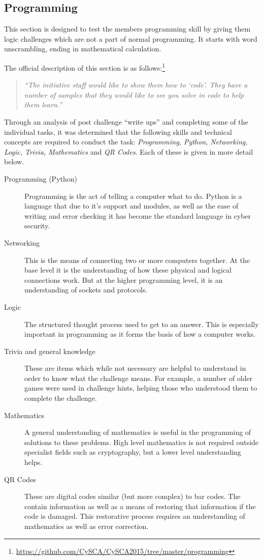 \documentclass[twoside,a4paper,11pt]{report}
\begin{document}
		\subsection{Programming}
			This section is designed to test the members programming skill by giving them logic challenges which are not a part of normal programming. 
			It starts with word unscrambling, ending in mathematical calculation. 
			
			The official description of this section is as follows:\footnote{\url{https://github.com/CySCA/CySCA2015/tree/master/programming}}
			\begin{quote}
				\textit{``The initiative staff would like to show them how to `code'. They have a number of samples that they would like to see you solve in code to help them learn.''}
			\end{quote}

			Through an analysis of post challenge ``write ups'' and completing some of the individual tasks, 
			it was determined that the following skills and technical concepts are required to conduct the task: 
			\textit{Programming, Python, Networking, Logic, Trivia, Mathematics} and \textit{QR Codes}.
			Each of these is given in more detail below. 
			\begin{description}
				\item[Programming (Python)]
					Programming is the act of telling a computer what to do. 
					Python is a language that due to it's support and modules, as well as the ease of writing and error checking it has become the standard language in cyber security. 
				\item[Networking]
					This is the means of connecting two or more computers together. 
					At the base level it is the understanding of how these physical and logical connections work. 
					But at the higher programming level, it is an understanding of sockets and protocols. 
				\item[Logic]
					The structured thought process used to get to an answer. 
					This is especially important in programming as it forms the basis of how a computer works. 
				\item[Trivia and general knowledge] 
					These are items which while not necessary are helpful to understand in order to know what the challenge means. 
					For example, a number of older games were used in challenge hints, helping those who understood them to complete the challenge. 
				\item[Mathematics] 
					A general understanding of mathematics is useful in the programming of solutions to these problems. 
					High level mathematics is not required outside specialist fields such as cryptography, but a lower level understanding helps. 
				\item[QR Codes]
					These are digital codes similar (but more complex) to bar codes.
					The contain information as well as a means of restoring that information if the code is damaged. 
					This restorative process requires an understanding of mathematics as well as error correction. 
			\end{description}
\end{document}
